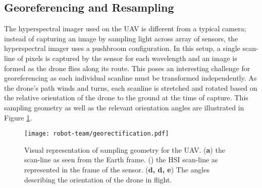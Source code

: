 

\subsection{Georeferencing and Resampling}

The hyperspectral imager used on the UAV is different from a typical camera;
instead of capturing an image by sampling light across array of sensors, the
hyperspectral imager uses a pushbroom configuration. In this setup, a single
scan-line of pixels is captured by the sensor for each wavelength and an image
is formed as the drone flies along its route. This poses an interesting
challenge for georeferencing as each individual scanline must be transformed
independently. As the drone's path winds and turns, each scanline
is stretched and rotated based on the relative orientation of
the drone to the ground at the time of capture. This sampling geometry as well
as the relevant orientation angles are illustrated in Figure
\ref{fig:georectification}.

\begin{figure}[h]
  \centering
  \texttt{[image: robot-team/georectification.pdf]}
  \caption{Visual representation of sampling geometry for the UAV. (\textbf{a})
    the scan-line as seen from the Earth frame. () the HSI scan-line as
    represented in the frame of the sensor. (\textbf{d, d, e}) The angles
    describing the orientation of the drone in flight.}
  \label{fig:georectification}
\end{figure}

